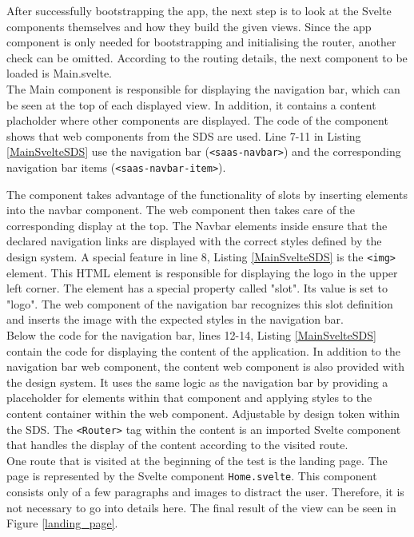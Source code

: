 After successfully bootstrapping the app, the next step is to look at the Svelte components themselves and how they build the given views. Since the app component is only needed for bootstrapping and initialising the router, another check can be omitted. According to the routing details, the next component to be loaded is Main.svelte. \\
The Main component is responsible for displaying the navigation bar, which can be seen at the top of each displayed view. In addition, it contains a content placholder where other components are displayed. The code of the component shows that web components from the \ac{SDS} are used. Line 7-11 in Listing \ref{MainSvelteSDS} use the navigation bar (\texttt{<saas-navbar>}) and the corresponding navigation bar items (\texttt{<saas-navbar-item>}).

The component takes advantage of the functionality of slots by inserting elements into the navbar component. The web component then takes care of the corresponding display at the top. The Navbar elements inside ensure that the declared navigation links are displayed with the correct styles defined by the design system. A special feature in line 8, Listing \ref{MainSvelteSDS} is the \texttt{<img>} element. This \ac{HTML} element is responsible for displaying the logo in the upper left corner. The element has a special property called "slot". Its value is set to "logo". The web component of the navigation bar recognizes this slot definition and inserts the image with the expected styles in the navigation bar. \\
Below the code for the navigation bar, lines 12-14, Listing \ref{MainSvelteSDS} contain the code for displaying the content of the application. In addition to the navigation bar web component, the content web component is also provided with the design system. It uses the same logic as the navigation bar by providing a placeholder for elements within that component and applying styles to the content container within the web component. Adjustable by design token within the SDS. The \texttt{<Router>} tag within the content is an imported Svelte component that handles the display of the content according to the visited route. \\
One route that is visited at the beginning of the test is the landing page. The page is represented by the Svelte component \texttt{Home.svelte}. This component consists only of a few paragraphs and images to distract the user. Therefore, it is not necessary to go into details here. The final result of the view can be seen in Figure \ref{landing_page}.\\
